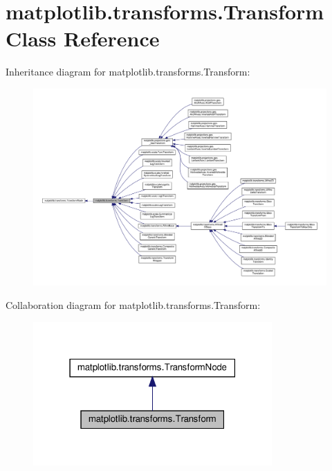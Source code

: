 \hypertarget{classmatplotlib_1_1transforms_1_1Transform}{}\section{matplotlib.\+transforms.\+Transform Class Reference}
\label{classmatplotlib_1_1transforms_1_1Transform}


Inheritance diagram for matplotlib.\+transforms.\+Transform\+:
\nopagebreak
\begin{figure}[H]
\begin{center}
\leavevmode
\includegraphics[width=350pt]{classmatplotlib_1_1transforms_1_1Transform__inherit__graph}
\end{center}
\end{figure}


Collaboration diagram for matplotlib.\+transforms.\+Transform\+:
\nopagebreak
\begin{figure}[H]
\begin{center}
\leavevmode
\includegraphics[width=259pt]{classmatplotlib_1_1transforms_1_1Transform__coll__graph}
\end{center}
\end{figure}
